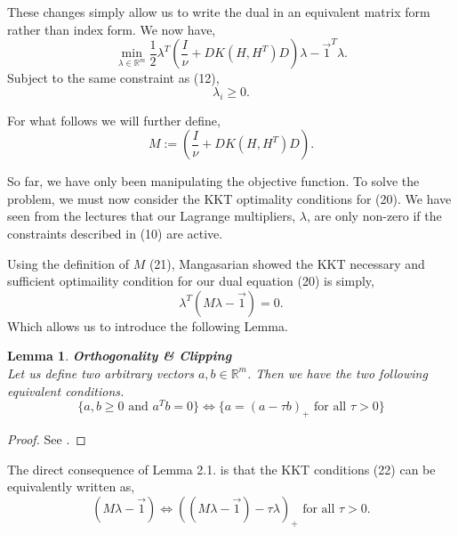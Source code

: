 \documentclass{article}
\newtheorem{lemma}[theorem]{Lemma}
\begin{document}
These changes simply allow us to write the dual in an equivalent matrix form rather than index form. We now have,
\begin{equation}
    \min_{\lambda \in \mathbb{R}^{m}} {\frac{1}{2} \lambda^{T} (\frac{I}{\nu} + DK(H, H^{T})D) \lambda - \Vec{1}^{T} \lambda }.
\end{equation}
Subject to the same constraint as (12),
\begin{equation*}
    \lambda_{i} \geq 0.
\end{equation*}

For what follows we will further define,
\begin{equation}
    M := (\frac{I}{\nu} + DK(H, H^{T})D).
\end{equation}

So far, we have only been manipulating the objective function. To solve the problem, we must now consider the KKT optimality conditions for (20). We have seen from the lectures that our Lagrange multipliers, $\lambda$, are only non-zero if the constraints described in (10) are active. 

Using the definition of $M$ (21), Mangasarian \cite{mangasarian1994nonlinear} showed the KKT necessary and sufficient optimaility condition for our dual equation (20) is simply,
\begin{equation}
    \lambda^{T} (M \lambda - \Vec{1}) = 0.
\end{equation}
Which allows us to introduce the following Lemma.

\begin{lemma} \textbf{Orthogonality \& Clipping} \\
Let us define two arbitrary vectors $a, b \in \mathbb{R}^m$. Then we have the two following equivalent conditions.
\begin{equation}
    \{a, b \geq 0 \text{ and } a^{T}b = 0\} \Longleftrightarrow \{a = (a-\tau b)_{+} \text{ for all } \tau > 0\}
\end{equation}
\end{lemma}
\begin{proof}
See \cite{scholkopf2002learning:ch10}.
\end{proof}

The direct consequence of Lemma 2.1. is that the KKT conditions (22) can be equivalently written as,
\begin{equation}
    (M \lambda - \Vec{1}) \Longleftrightarrow ((M \lambda - \Vec{1}) - \tau \lambda)_{+} \text{ for all } \tau > 0.
\end{equation}
\end{document}
